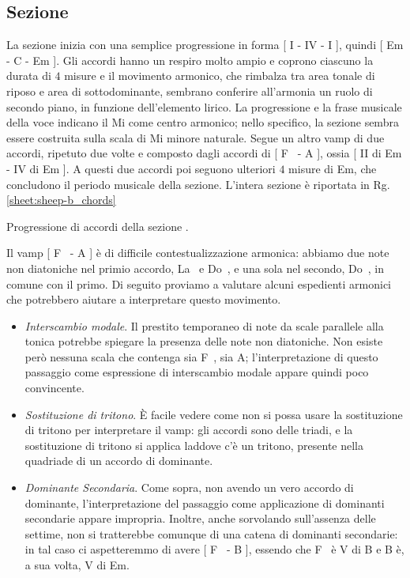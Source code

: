 \documentclass[class=book, crop=false, oneside, 12pt]{standalone}
\begin{document}
    \subsection{Sezione }
    La sezione  inizia con una semplice progressione in forma [ I - IV - I ], quindi [ Em - C - Em ]. Gli accordi hanno un respiro molto ampio e coprono ciascuno la durata di \(4\) misure e il movimento armonico, che rimbalza tra area tonale di riposo e area di sottodominante, sembrano conferire all'armonia un ruolo di secondo piano, in funzione dell'elemento lirico. La progressione e la frase musicale della voce indicano il Mi come centro armonico; nello specifico, la sezione sembra essere costruita sulla scala di Mi minore naturale.
    Segue un altro vamp di due accordi, ripetuto due volte e composto dagli accordi di [ F\sharp~ - A ], ossia [ II di Em - IV di Em ].  A questi due accordi poi seguono ulteriori \(4\) misure di Em, che concludono il periodo musicale della sezione. L'intera sezione è riportata in Rg.\ref{sheet:sheep-b_chords}

    \begin{sheet}[htb]
        \centering
        \caption{Progressione di accordi della sezione .}
        \label{sheet:sheep-b_chords}
    \end{sheet}
    

    Il vamp [ F\sharp~ - A ] è  di difficile contestualizzazione armonica: abbiamo due note non diatoniche nel primio accordo, La\sharp~ e Do\sharp~, e una sola nel secondo, Do\sharp~, in comune con il primo. Di seguito proviamo a valutare alcuni espedienti armonici che potrebbero aiutare a interpretare questo movimento.
    \begin{itemize}
        \item \emph{Interscambio modale}. Il prestito temporaneo di note da scale parallele alla tonica potrebbe spiegare la presenza delle note non diatoniche. Non esiste però nessuna scala che contenga sia F\sharp~, sia A; l'interpretazione di questo passaggio come espressione di interscambio modale appare quindi poco convincente.
        \item \emph{Sostituzione di tritono}. È facile vedere come non si possa usare la sostituzione di tritono per interpretare il vamp: gli accordi sono delle triadi, e la sostituzione di tritono si applica laddove c'è un tritono, presente nella quadriade di un accordo di dominante.
        \item \emph{Dominante Secondaria}. Come sopra, non avendo un vero accordo di dominante, l'interpretazione del passaggio come applicazione di dominanti secondarie appare impropria. Inoltre, anche sorvolando sull'assenza delle settime, non si tratterebbe comunque di una catena di dominanti secondarie: in tal caso ci aspetteremmo di avere [ F\sharp~ - B ], essendo che F\sharp~ è V di B e B è, a sua volta, V di Em.
    \end{itemize}
    
\end{document}

